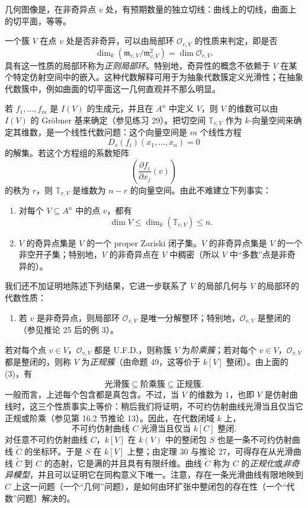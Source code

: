 几何图像是，在非奇异点 $v$ 处，有预期数量的独立切线：曲线上的切线，曲面上的切平面，等等。

一个簇 $V$ 在点 $v$ 处是否非奇异，可以由局部环 $\mathcal O_{v,V}$ 的性质来判定，即是否
\[
\dim_k(\mathfrak m_{v,V}/\mathfrak m_{v,V}^2)=\dim\mathcal O_{v,V}.
\]
具有这一性质的局部环称为\emph{正则局部环}。特别地，奇异性的概念不依赖于 $V$ 在某个特定仿射空间中的嵌入。这种代数解释可用于为抽象代数簇定义光滑性；在抽象代数簇中，例如曲面的切平面这一几何直观并不那么明显。

若 $f_1,\ldots,f_m$ 是 $I(V)$ 的生成元，并且在 $A^n$ 中定义 $V$，则 $V$ 的维数可以由 $I(V)$ 的 Gröbner 基来确定（参见练习 29）。把切空间 $\mathbb T_{v,V}$ 作为 $k$-向量空间来确定其维数，是一个线性代数问题：这个向量空间是 $m$ 个线性方程
\[
D_v(f_i)(x_1,\ldots,x_n)=0
\]
的解集。若这个方程组的系数矩阵
\[
\left(\frac{\partial f_i}{\partial x_j}(v)\right)
\]
的秩为 $r$，则 $\mathbb T_{v,V}$ 是维数为 $n-r$ 的向量空间。由此不难建立下列事实：

\begin{enumerate}[label=\arabic*.]
	\item 对每个 $V\subseteq A^n$ 中的点 $v$，都有
	\[
	\dim V\le \dim_k(\mathbb T_{v,V})\le n.
	\]
	\item $V$ 的奇异点集是 $V$ 的一个 proper Zariski 闭子集。$V$ 的非奇异点集是 $V$ 的一个非空开子集；特别地，$V$ 的非奇异点在 $V$ 中稠密（所以 $V$ 中“多数”点是非奇异的）。
\end{enumerate}
我们还不加证明地陈述下列结果，它进一步联系了 $V$ 的局部几何与 $V$ 的局部环的代数性质：
\begin{enumerate}[label=\arabic*.,resume]
	\item 若 $v$ 是非奇异点，则局部环 $\mathcal O_{v,V}$ 是唯一分解整环；特别地，$\mathcal O_{v,V}$ 是整闭的（参见推论 25 后的例 3）。
\end{enumerate}

若对每个点 $v\in V$，$\mathcal O_{v,V}$ 都是 U.F.D.，则称簇 $V$ 为\emph{阶乘簇}；若对每个 $v\in V$，$\mathcal O_{v,V}$ 都是整闭的，则称 $V$ 为\emph{正规簇}（由命题 49，这等价于 $k[V]$ 整闭）。由上面的 (3)，有
\[
\text{光滑簇}\subseteq\text{阶乘簇}\subseteq\text{正规簇}.
\]
一般而言，上述每个包含都是真包含。不过，当 $V$ 的维数为 $1$，也即 $V$ 是仿射曲线时，这三个性质事实上等价：稍后我们将证明，不可约仿射曲线光滑当且仅当它正规或阶乘（参见第 16.2 节推论 13）。因此，在代数闭域 $k$ 上，
\[
\text{不可约仿射曲线 }C\text{ 光滑当且仅当 }k[C]\text{ 整闭}.
\]
对任意不可约仿射曲线 $C$，$k[V]$ 在 $k(V)$ 中的整闭包 $S$ 也是一条不可约仿射曲线 $\widetilde C$ 的坐标环。于是 $S$ 在 $k[V]$ 上整；由定理 30 与推论 27，可得存在从光滑曲线 $\widetilde C$ 到 $C$ 的态射，它是满的并且具有有限纤维。曲线 $\widetilde C$ 称为 $C$ 的\emph{正规化}或\emph{非奇异模型}，并且可以证明它在同构意义下唯一。注意，存在一条光滑曲线有限地映到 $C$ 上这一问题（一个“几何”问题），是如何由环扩张中整闭包的存在性（一个“代数”问题）解决的。

